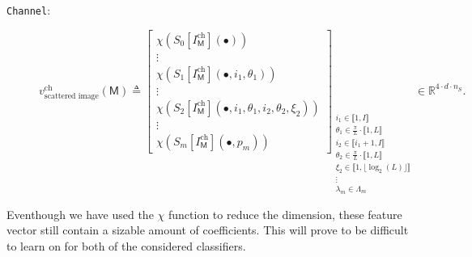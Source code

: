 \begin{description}
                \item[\texttt{Channel}:]
                        \begin{equation}
                            \label{eq::channel_scatnet_image_based_features}
                            v^{\text{ch}}_{\text{scattered image}}\left(\mathsf{M}\right) \triangleq \begin{bmatrix}
                                \chi \left(S_0[I^{\text{ch}}_{\mathsf{M}}]\left(\bullet\right)\right)\\
                                \vdots\\
                                \chi \left(S_1[I^{\text{ch}}_{\mathsf{M}}]\left(\bullet, i_1, \theta_1\right)\right)\\
                                \vdots\\
                                \chi \left(S_2[I^{\text{ch}}_{\mathsf{M}}]\left(\bullet, i_1, \theta_1, i_2, \theta_2, \xi_2\right)\right)\\
                                \vdots\\
                                \chi \left(S_m[I^{\text{ch}}_{\mathsf{M}}]\left(\bullet, p_m\right)\right)
                            \end{bmatrix}_{
                                \substack{
                                    i_1 \in \llbracket 1, I \rrbracket\\
                                    \theta_1 \in \frac{\pi}{L} \cdot \llbracket 1, L \rrbracket\\
                                    i_2 \in \llbracket i_1 + 1, I \rrbracket\\
                                    \theta_2 \in \frac{\pi}{L} \cdot \llbracket 1, L \rrbracket\\
                                    \xi_2 \in \llbracket 1, \lfloor\log_2(L)\rfloor \rrbracket\\
                                    \vdots\\
                                    \lambda_m \in \Lambda_m
                                }
                            } \in \mathbb{R}^{4 \cdot d \cdot n_S}.
                        \end{equation}
            \end{description}
        
            Eventhough we have used the \(\chi\) function to reduce the dimension, these feature vector still contain a sizable amount of coefficients.
            This will prove to be difficult to learn on for both of the considered classifiers.
